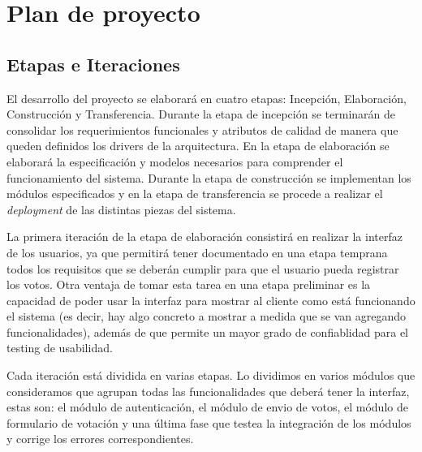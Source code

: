 \section{Plan de proyecto}

\subsection{Etapas e Iteraciones}

El desarrollo del proyecto se elaborar\'a en cuatro etapas: Incepción, Elaboración, Construcción y Transferencia. Durante la etapa de incepción se terminar\'an de consolidar los requerimientos funcionales y atributos de calidad de manera que queden definidos los drivers de la arquitectura. En la etapa de elaboración se elaborar\'a la especificación y modelos necesarios para comprender el funcionamiento del sistema. Durante la etapa de construcción se implementan los m\'odulos especificados y en la etapa de transferencia se procede a realizar el \textit{deployment} de las distintas piezas del sistema.  
\\ \par

La primera iteración de la etapa de elaboración consistirá en realizar la interfaz de los usuarios, ya que permitirá tener documentado en una etapa temprana todos los requisitos que se deber\'an cumplir para que el usuario pueda registrar los votos. Otra ventaja de tomar esta tarea en una etapa preliminar es la capacidad de poder usar la interfaz para mostrar al cliente como está funcionando el sistema (es decir, hay algo concreto a mostrar a medida que se van agregando funcionalidades), además de que permite un mayor grado de confiablidad para el testing de usabilidad. 
\\ \par
Cada iteración está dividida en varias etapas. Lo dividimos en varios m\'odulos que consideramos que agrupan todas las funcionalidades que deber\'a tener la interfaz, estas son: el m\'odulo de autenticación, el m\'odulo de envio de votos, el m\'odulo de formulario de votaci\'on y una \'ultima fase que testea la integraci\'on de los m\'odulos y corrige los errores correspondientes.

